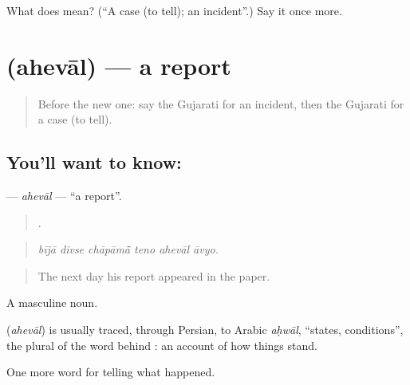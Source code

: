 \begin{tcolorbox}[breakable,colback=teal!4,colframe=teal!35!black,title={Before you move on}]
What does  mean? (\textquotedblleft{}A case (to tell); an incident\textquotedblright{}.) Say it once more.
\end{tcolorbox}
\section[\texorpdfstring{\gu{અહેવાલ} (ahevāl)}{અહેવાલ (ahevāl)}]{ (ahevāl) — a report}

\label{lesson:GU-C312-aheval}



\begin{quote}
Before the new one: say the Gujarati for an incident, then the Gujarati for a case (to tell).
\end{quote}

\subsection*{You'll want to know: }
\textbf{} — \emph{ahevāl} — \textquotedblleft{}a report\textquotedblright{}.

\begin{quote}
     .
\end{quote}

\begin{quote}
\emph{bījā divse chāpāmā̃ teno ahevāl āvyo.}
\end{quote}

\begin{quote}
The next day his report appeared in the paper.
\end{quote}

A masculine noun.

\begin{cousinweb}
\textbf{} (\emph{ahevāl}) is usually traced, through Persian, to Arabic \emph{aḥwāl}, \textquotedblleft{}states, conditions\textquotedblright{}, the plural of the word behind \textbf{}: an account of how things stand.
\end{cousinweb}

\begin{grammarlens}[title={What you've built}]
One more word for telling what happened.
\end{grammarlens}

